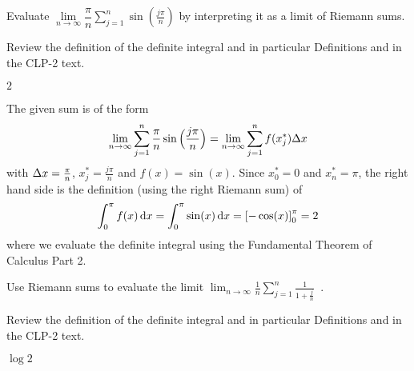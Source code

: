 \begin{Mquestion}[2002A]
Evaluate
$\lim\limits_{n\rightarrow\infty}\dfrac{\pi}{n}\displaystyle\sum\limits_{j=1}^n
\sin\left(\frac{j\pi}{n}\right)$ by interpreting it as a limit of Riemann sums.
\end{Mquestion}

\begin{hint}
Review the definition of the definite integral and in particular
Definitions    and
                  in the
CLP-2 text.
\end{hint}

\begin{answer}
$2$
\end{answer}

\begin{solution}
The given sum is of the form
\begin{align*}
\lim_{n\rightarrow\infty}\sum_{j=1}^n
\frac{\pi}{n}\sin\Big(\frac{j\pi}{n}\Big)
=\lim_{n\rightarrow\infty}\sum_{j=1}^n
f(x_j^*)\Delta x
\end{align*}
with $\Delta x=\frac{\pi}{n}$, $x_j^*=\frac{j\pi}{n}$ and $f(x)=\sin(x)$.
Since $x_0^*=0$ and $x_n^*=\pi$, the right hand side is the definition (using
the right Riemann sum)  of
\begin{align*}
\int_0^\pi f(x)\,\mathrm{d}x=\int_0^\pi \sin(x)\,\mathrm{d}x
=\left[-\cos(x)\right]_0^\pi=2
\end{align*}
where we evaluate the definite integral using the Fundamental Theorem of Calculus Part 2.
\end{solution}

\begin{question}[M121 2002A]
Use Riemann sums to evaluate the limit
$\displaystyle\lim_{n\rightarrow\infty}\frac{1}{n}
       \sum_{j=1}^n \frac{1}{1+\frac{j}{n}}$\ .
\end{question}

\begin{hint}
Review the definition of the definite integral and in particular
Definitions    and
                  in the
CLP-2 text.
\end{hint}

\begin{answer}
$\log 2$
\end{answer}

